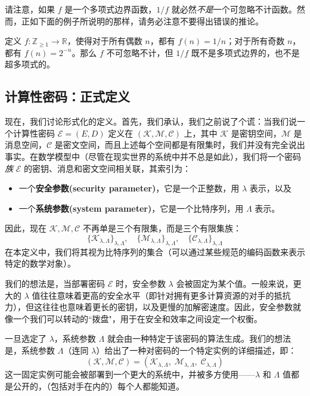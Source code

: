 请注意，如果 $f$ 是一个多项式边界函数，$1/f$ 就必然\emph{不是}一个可忽略不计函数。然而，正如下面的例子所说明的那样，请务必注意不要得出错误的推论。

\begin{example}
定义 $f:\mathbb{Z}_{\geq1}\to\mathbb{R}$，使得对于所有偶数 $n$，都有 $f(n)={1}/{n}$；对于所有奇数 $n$，都有 $f(n)=2^{-n}$。那么 $f$ 不可忽略不计，但 $1/f$ 既不是多项式边界的，也不是超多项式的。
\end{example}

\subsection{计算性密码：正式定义}

现在，我们讨论形式化的定义。首先，我们承认，我们之前说了个谎：当我们说一个计算性密码 $\mathcal{E}=(E,D)$ 定义在 $(\mathcal{K},\mathcal{M},\mathcal{C})$ 上，其中 $\mathcal{K}$ 是密钥空间，$\mathcal{M}$ 是消息空间，$\mathcal{C}$ 是密文空间，而且上述每个空间都是有限集时，我们并没有完全说出事实。在数学模型中（尽管在现实世界的系统中并不总是如此），我们将一个密码\emph{族} $\mathcal{E}$ 的密钥、消息和密文空间相关联，其索引为：
\begin{itemize}
	\item 一个\textbf{安全参数(security parameter)}，它是一个正整数，用 $\lambda$ 表示，以及
	\item 一个\textbf{系统参数(system parameter)}，它是一个比特序列，用 $\Lambda$ 表示。
\end{itemize}
因此，现在 $\mathcal{K},\mathcal{M},\mathcal{C}$ 不再单是三个有限集，而是三个有限集族：
\[
\{\mathcal{K}_{\lambda,\Lambda}\}_{\lambda,\Lambda},\quad
\{\mathcal{M}_{\lambda,\Lambda}\}_{\lambda,\Lambda},\quad
\{\mathcal{C}_{\lambda,\Lambda}\}_{\lambda,\Lambda}
\]
在本定义中，我们将其视为比特序列的集合（可以通过某些规范的编码函数来表示特定的数学对象）。

我们的想法是，当部署密码 $\mathcal{E}$ 时，安全参数 $\lambda$ 会被固定为某个值。一般来说，更大的 $\lambda$ 值往往意味着更高的安全水平（即针对拥有更多计算资源的对手的抵抗力），但这往往也意味着更长的密钥，以及更慢的加解密速度。因此，安全参数就像一个我们可以转动的``拨盘"，用于在安全和效率之间设定一个权衡。

一旦选定了 $\lambda$，系统参数 $\Lambda$ 就会由一种特定于该密码的算法生成。我们的想法是，系统参数 $\Lambda$（连同 $\lambda$）给出了一种对密码的一个特定实例的详细描述，即：
\[
(\mathcal{K},\mathcal{M},\mathcal{C})
=(
\mathcal{K}_{\lambda,\Lambda},\;
\mathcal{M}_{\lambda,\Lambda},\;
\mathcal{C}_{\lambda,\Lambda}
)
\]
这一固定实例可能会被部署到一个更大的系统中，并被多方使用——$\lambda$ 和 $\Lambda$ 值都是公开的，（包括对手在内的）每个人都能知道。

